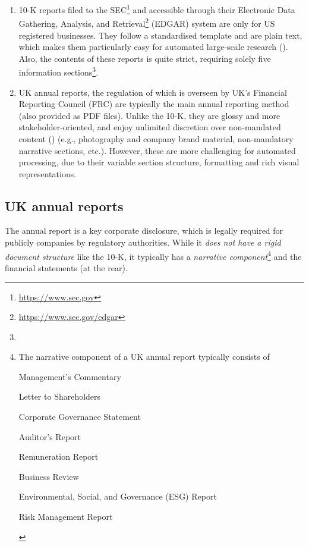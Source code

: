 \begin{enumerate}
    \item 10-K reports filed to the SEC\footnote{\url{https://www.sec.gov}} and accessible through their Electronic Data Gathering, Analysis, and Retrieval\footnote{\url{https://www.sec.gov/edgar}} (EDGAR) system are only for US registered businesses.
    They follow a standardised template and are plain text, which makes them particularly easy for automated large-scale research (\cite{el-haj2019retrieving}).
    Also, the contents of these reports is quite strict, requiring solely five information sections\footnote{
    }.
    \item UK annual reports, the regulation of which is overseen by UK's Financial Reporting Council (FRC) are typically the main annual reporting method (also provided as PDF files).
    Unlike the 10-K, they are glossy and more stakeholder-oriented, and enjoy unlimited discretion over non-mandated content (\cite{el-haj2019retrieving}) (e.g., photography and company brand material, non-mandatory narrative sections, etc.).
    However, these are more challenging for automated processing, due to their variable section structure, formatting and rich visual representations.
\end{enumerate}

\subsection{UK annual reports}\label{subsec:uk-annual-reports}
The annual report is a key corporate disclosure, which is legally required for publicly companies by regulatory authorities.
While it \emph{does not have a rigid document structure} like the 10-K, it typically has a \emph{narrative component}\footnote{The narrative component of a UK annual report typically consists of
\begin{enumerate*}
    \item Management's Commentary
    \item Letter to Shareholders
    \item Corporate Governance Statement
    \item Auditor's Report
    \item Remuneration Report
    \item Business Review
    \item Environmental, Social, and Governance (ESG) Report
    \item Risk Management Report
\end{enumerate*}
} and the financial statements (at the rear).

